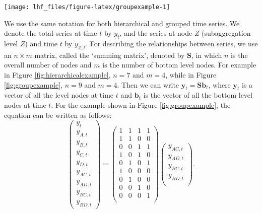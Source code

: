 \documentclass[11pt,a4paper,]{article}
\let\origfigure\figure
\let\endorigfigure\endfigure
\renewenvironment{figure}[1][2] {
    \expandafter\origfigure\expandafter[!htbp]
} {
    \endorigfigure
}
\begin{document}
\begin{figure}

{\centering \texttt{[image: lhf\_files/figure-latex/groupexample-1]} 

}

\caption{An example of a two level grouped structure.}\label{fig:groupexample}
\end{figure}

We use the same notation \autocite[following][]{fpp2} for both
hierarchical and grouped time series. We denote the total series at time
\(t\) by \(y_t\), and the series at node \(Z\) (subaggregation level
\(Z\)) and time \(t\) by \(y_{Z,t}\). For describing the relationships
between series, we use an \(n\times m\) matrix, called the `summing
matrix', denoted by \(\bm{S}\), in which \(n\) is the overall number of
nodes and \(m\) is the number of bottom level nodes. For example in
Figure \ref{fig:hierarchicalexample}, \(n = 7\) and \(m = 4\), while in
Figure \ref{fig:groupexample}, \(n=9\) and \(m=4\). Then we can write
\(\bm{y}_t=\bm{S}\bm{b}_t\), where \(\bm{y}_t\) is a vector of all the
level nodes at time \(t\) and \(\bm{b}_t\) is the vector of all the
bottom level nodes at time \(t\). For the example shown in Figure
\ref{fig:groupexample}, the equation can be written as follows:
\begin{equation}\label{eq:Smatrixexample}
\begin{pmatrix}
  y_{t}\\y_{A,t}\\y_{B,t}\\y_{C,t}\\y_{D,t}\\y_{AC,t}\\y_{AD,t}\\y_{BC,t}\\y_{BD,t}
\end{pmatrix} =
\begin{pmatrix}
  1&1&1&1\\1&1&0&0\\0&0&1&1\\1&0&1&0\\0&1&0&1\\1&0&0&0\\0&1&0&0\\0&0&1&0\\0&0&0&1\\
\end{pmatrix}
\begin{pmatrix}
  y_{AC,t}\\y_{AD,t}\\y_{BC,t}\\y_{BD,t}\\
\end{pmatrix}.
\end{equation}
\end{document}
